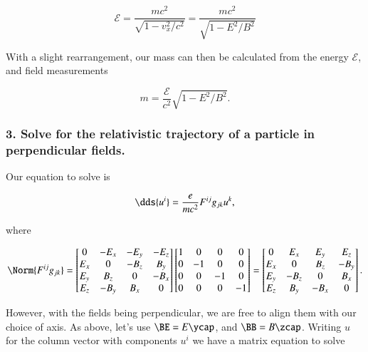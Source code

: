 \begin{equation}\label{eqn:relElectroDynProblemSet2:450}
\mathcal{E} = \frac{m c^2}{\sqrt{1 - v_x^2/c^2}} = \frac{ m c^2 }{ \sqrt{ 1 - E^2/B^2 }}
\end{equation}

With a slight rearrangement, our mass can then be calculated from the energy $\mathcal{E}$, and field measurements

\begin{equation}\label{eqn:relElectroDynProblemSet2:470}
m = \frac{ \mathcal{E} }{c^2} \sqrt{ 1 - E^2/B^2 }.
\end{equation}

\subsubsection{3.  Solve for the relativistic trajectory of a particle in perpendicular fields.}

Our equation to solve is

\begin{equation}\label{eqn:relElectroDynProblemSet2:490}
\dds{u^i} = \frac{e}{m c^2} F^{ij} g_{jk} u^k,
\end{equation}

where

\begin{equation}\label{eqn:relElectroDynProblemSet2:510}
\Norm{ F^{ij} g_{jk} } = 
\begin{bmatrix}
0 & -E_x & -E_y & -E_z \\
E_x & 0 & -B_z & B_y \\
E_y & B_z & 0 & -B_x \\
E_z & -B_y & B_x & 0
\end{bmatrix}
\begin{bmatrix}
1 & 0 & 0 & 0 \\
0 & -1 & 0 & 0 \\
0 & 0 & -1 & 0 \\
0 & 0 & 0 & -1 \\
\end{bmatrix}
=
\begin{bmatrix}
0 & E_x & E_y & E_z \\
E_x & 0 & B_z & -B_y \\
E_y & -B_z & 0 & B_x \\
E_z & B_y & -B_x & 0
\end{bmatrix}.
\end{equation}

However, with the fields being perpendicular, we are free to align them with our choice of axis.  As above, let's use $\BE = E \ycap$, and $\BB = B \zcap$.  Writing $u$ for the column vector with components $u^i$ we have a matrix equation to solve

